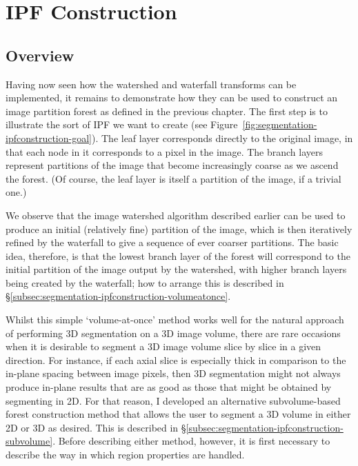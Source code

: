 \clearpage

\section{IPF Construction}
\label{sec:segmentation-ipfconstruction}

\subsection{Overview}

Having now seen how the watershed and waterfall transforms can be implemented, it remains to demonstrate how they can be used to construct an image partition forest as defined in the previous chapter. The first step is to illustrate the sort of IPF we want to create (see Figure~\ref{fig:segmentation-ipfconstruction-goal}). The leaf layer corresponds directly to the original image, in that each node in it corresponds to a pixel in the image. The branch layers represent partitions of the image that become increasingly coarse as we ascend the forest. (Of course, the leaf layer is itself a partition of the image, if a trivial one.)


We observe that the image watershed algorithm described earlier can be used to produce an initial (relatively fine) partition of the image, which is then iteratively refined by the waterfall to give a sequence of ever coarser partitions. The basic idea, therefore, is that the lowest branch layer of the forest will correspond to the initial partition of the image output by the watershed, with higher branch layers being created by the waterfall; how to arrange this is described in \S\ref{subsec:segmentation-ipfconstruction-volumeatonce}.

Whilst this simple `volume-at-once' method works well for the natural approach of performing 3D segmentation on a 3D image volume, there are rare occasions when it is desirable to segment a 3D image volume slice by slice in a given direction. For instance, if each axial slice is especially thick in comparison to the in-plane spacing between image pixels, then 3D segmentation might not always produce in-plane results that are as good as those that might be obtained by segmenting in 2D. For that reason, I developed an alternative subvolume-based forest construction method that allows the user to segment a 3D volume in either 2D or 3D as desired. This is described in \S\ref{subsec:segmentation-ipfconstruction-subvolume}. Before describing either method, however, it is first necessary to describe the way in which region properties are handled.

